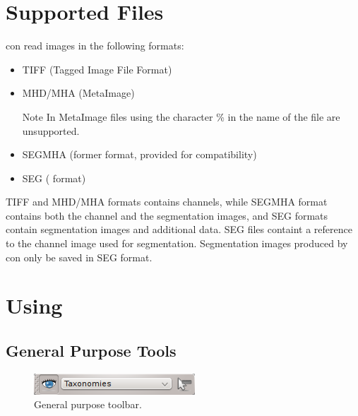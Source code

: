 \section{Supported Files}
\espina{} con read images in the following formats:
\begin{itemize}
  \item TIFF (Tagged Image File Format)
  \item MHD/MHA (MetaImage)\\
\begin{bclogo}[couleur = yellow!33, logo=\bcattention]
{Note} In MetaImage files using the character \% in the name of the file are unsupported.
\end{bclogo}
  \item SEGMHA (former \espina{} format, provided for compatibility)
  \item SEG (\espina{} format)
\end{itemize}
TIFF and MHD/MHA formats contains channels, while SEGMHA format contains both the channel and the
segmentation images, and SEG formats contain segmentation images and additional data. SEG 
files containt a reference to the channel image used for segmentation. Segmentation images
produced by \espina{} con only be saved in SEG format.

\section{Using \espina}

\subsection{General Purpose Tools}
\begin{figure}[H]
\centering
\includegraphics{fig/MainToolbar}
\caption{General purpose toolbar.}
\end{figure}

